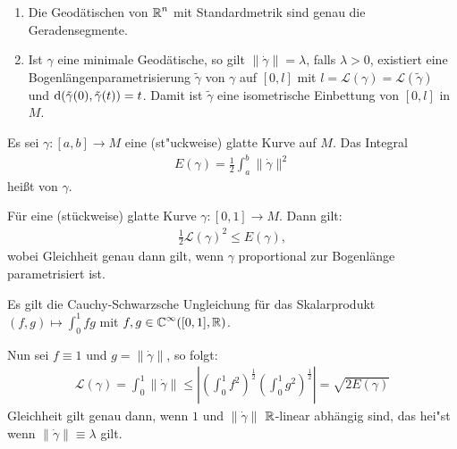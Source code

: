 
\begin{bem}\begin{enumerate}[label=\arabic*),leftmargin=*]
\item
	Die Geodätischen von $\operatorname{\mathbb{R}}^n$ mit Standardmetrik sind genau die Geradensegmente.
\item
	Ist $\gamma$ eine minimale Geodätische, so gilt $\|\dot\gamma\| = \lambda$, falls $\lambda > 0$, existiert eine Bogenlängenparametrisierung $\tilde\gamma$ von $\gamma$ auf $[0,l]$ mit $l = \mathcal L(\gamma) = \mathcal L(\tilde\gamma)$ und $\mathrm{d}(\tilde\gamma(0),\tilde\gamma(t)) = t$.
	Damit ist $\tilde\gamma$ eine isometrische Einbettung von $[0,l]$ in $M$.
\end{enumerate}\end{bem}

\begin{Dfn}
  Es sei $\gamma \colon [a,b] \to M$ eine (st"uckweise) glatte Kurve auf $M$.
  Das Integral
  \begin{align*}
    E(\gamma) = \frac{1}2 \int_a^b\|\dot\gamma\|^2
  \end{align*}
  heißt  von $\gamma$.
\end{Dfn}

\begin{Lemma}\label{lemma-6-9}
  Für eine (stückweise) glatte Kurve $\gamma \colon [0,1] \to M$.
  Dann gilt:
  \begin{align*}
    \frac{1}2 \mathcal L(\gamma)^2 \leq E(\gamma),
  \end{align*}
  wobei Gleichheit genau dann gilt, wenn $\gamma$ proportional zur Bogenlänge parametrisiert ist.
\end{Lemma}

\begin{bew}
  Es gilt die Cauchy-Schwarzsche Ungleichung für das Skalarprodukt $(f,g) \mapsto \int_0^1 fg$ mit $f,g \in \operatorname{\mathbb{C}}^{\infty}([0,1], \operatorname{\mathbb{R}})$.

  Nun sei $f \equiv 1$ und $g = \|\dot\gamma\|$, so folgt:
  \begin{align*}
    \mathcal L(\gamma) = \int_0^1 \|\dot\gamma\| \leq \left|\left(\int_0^1 f^2\right)^{\frac{1}2} \left(\int_0^1g^2\right)^{\frac{1}2}\right| = \sqrt{2 E(\gamma)}
  \end{align*}
  Gleichheit gilt genau dann, wenn $1$ und $\|\dot\gamma\|$ $\operatorname{\mathbb{R}}$-linear abhängig sind, das hei"st wenn $\|\dot\gamma\| \equiv \lambda$ gilt.
\end{bew}

